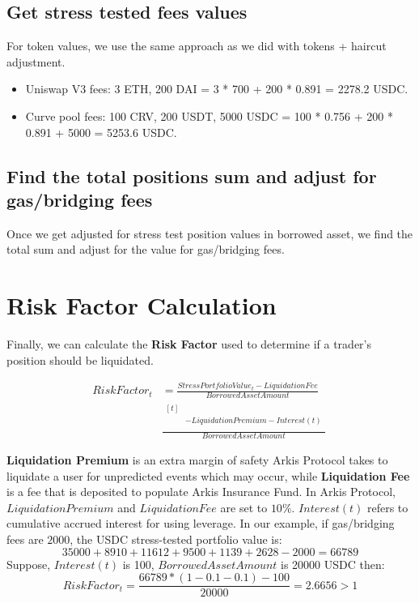 \documentclass[conference]{IEEEtran}
\begin{document}
\subsection{Get stress tested fees values}
 For token values, we use the same approach as we did with tokens + haircut adjustment. 
 \begin{itemize}
 	\item Uniswap V3 fees: 3 ETH, 200 DAI = 3 * 700 + 200 * 0.891 = 2278.2 USDC.
 	\item Curve pool fees: 100 CRV, 200 USDT, 5000 USDC = 100 * 0.756 + 200 * 0.891 + 5000 = 5253.6 USDC.
 \end{itemize}
 
 \subsection{Find the total positions sum and adjust for gas/bridging fees}
 
 Once we get adjusted for stress test position values in borrowed asset, we find the total sum and adjust for the value for gas/bridging fees.
 
 \section{Risk Factor Calculation}
 Finally, we can calculate the \textbf{Risk Factor} used to determine if a trader’s position should be liquidated. 
 
\begin{align}
RiskFactor_{t} &= \frac{StressPortfolioValue_{t}-LiquidationFee}{BorrowedAssetAmount} \nonumber \\
& \frac{\begin{aligned}[t] \\
  &-LiquidationPremium - Interest(t) \\
  \end{aligned}}{BorrowedAssetAmount} \nonumber \
\end{align}
 
 \textbf{Liquidation Premium} is an extra margin of safety Arkis Protocol takes to liquidate a user for unpredicted events which may occur, while \textbf{Liquidation Fee} is a fee that is deposited to populate Arkis Insurance Fund. In Arkis Protocol, $LiquidationPremium$ and $LiquidationFee$ are set to $10\%$. $Interest(t)$ refers to cumulative accrued interest for using leverage. In our example, if gas/bridging fees are $2000$, the USDC stress-tested portfolio value is: 
 $$35000 + 8910 + 11612 + 9500 + 1139 + 2628 - 2000 = 66789$$
Suppose, $Interest(t)$ is 100, $BorrowedAssetAmount$ is 20000 USDC then:
$$RiskFactor_{t}=\frac{66789*(1-0.1-0.1)-100}{20000}=2.6656>1$$
\end{document}
